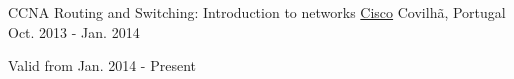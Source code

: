 \begin{cventries}
  \cventry
    {CCNA Routing and Switching: Introduction to networks} %
    {\href{https://www.cisco.com/}{Cisco}} %
    {Covilh\~a, Portugal} %
    {Oct. 2013 - Jan. 2014} %
    {
	    \begin{cvitems} %
        \item[] {Valid from Jan. 2014 - Present} %
      \end{cvitems}
    }

\end{cventries}
\newpage
